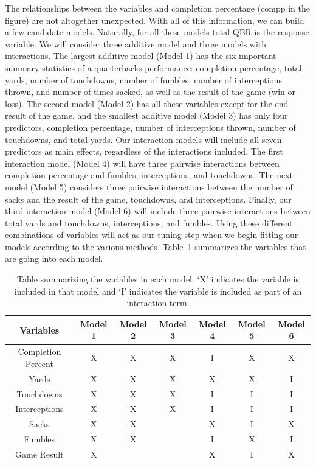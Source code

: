 \documentclass[12pt]{article}\usepackage[]{graphicx}\usepackage[]{color}
\begin{document}
The relationships between the variables and completion percentage (compp in the figure) are not altogether unexpected. With all of this information, we can build a few candidate models. Naturally, for all these models total QBR is the response variable. We will consider three additive model and three models with interactions. The largest additive model (Model 1) has the six important summary statistics of a quarterbacks performance: completion percentage, total yards, number of touchdowns, number of fumbles, number of interceptions thrown, and number of times sacked, as well as the result of the game (win or loss). The second model (Model 2) has all these variables except for the end result of the game, and the smallest additive model (Model 3) has only four predictors, completion percentage, number of interceptions thrown, number of touchdowns, and total yards. Our interaction models will include all seven predictors as main effects, regardless of the interactions included. The first interaction model (Model 4) will have three pairwise interactions between completion percentage and fumbles, interceptions, and touchdowns. The next model (Model 5) considers three pairwise interactions between the number of sacks and the result of the game, touchdowns, and interceptions. Finally, our third interaction model (Model 6) will include three pairwise interactions between total yards and touchdowns, interceptions, and fumbles. Using these different combinations of variables will act as our tuning step when we begin fitting our models according to the various methods. Table~\ref{tab:models} summarizes the variables that are going into each model.\\

\begin{table}[h]
\centering
\begin{tabular}{|c|c|c|c|c|c|c|}
\hline
Variables & Model 1 & Model 2 & Model 3 & Model 4 & Model 5 & Model 6\\
\hline
Completion Percent & X & X & X & I & X & X \\
\hline
Yards & X & X & X & X & X & I \\
\hline
Touchdowns & X & X & X & I & I & I \\
\hline
Interceptions & X & X & X & I & I & I \\
\hline
Sacks & X & X &  & X & I & X \\
\hline
Fumbles & X & X &  & I & X & I \\
\hline
Game Result & X & & & X & I & X\\
\hline
\end{tabular}
\captionsetup{font=footnotesize,labelfont=footnotesize}
\caption{\label{tab:models} Table summarizing the variables in each model. `X' indicates the variable is included in that model and `I' indicates the variable is included as part of an interaction term.}
\end{table}
\end{document}
